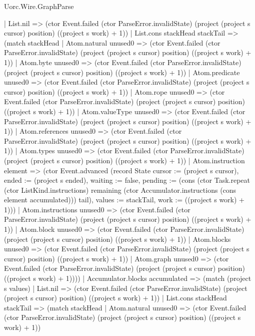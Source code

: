 \begin{lexlean}{Uorc.Wire.GraphParse}
\begin{semanticmodule}
{          | List.nil => (ctor Event.failed (ctor ParseError.invalidState) (project (project s cursor) position) ((project s work) + 1))
          | List.cons stackHead stackTail => (match stackHead
            | Atom.natural unused0 => (ctor Event.failed (ctor ParseError.invalidState) (project (project s cursor) position) ((project s work) + 1))
            | Atom.byte unused0 => (ctor Event.failed (ctor ParseError.invalidState) (project (project s cursor) position) ((project s work) + 1))
            | Atom.predicate unused0 => (ctor Event.failed (ctor ParseError.invalidState) (project (project s cursor) position) ((project s work) + 1))
            | Atom.rope unused0 => (ctor Event.failed (ctor ParseError.invalidState) (project (project s cursor) position) ((project s work) + 1))
            | Atom.valueType unused0 => (ctor Event.failed (ctor ParseError.invalidState) (project (project s cursor) position) ((project s work) + 1))
            | Atom.references unused0 => (ctor Event.failed (ctor ParseError.invalidState) (project (project s cursor) position) ((project s work) + 1))
            | Atom.types unused0 => (ctor Event.failed (ctor ParseError.invalidState) (project (project s cursor) position) ((project s work) + 1))
            | Atom.instruction element => (ctor Event.advanced (record State {cursor := (project s cursor), ended := (project s ended), waiting := false, pending := (cons (ctor Task.repeat (ctor ListKind.instructions) remaining (ctor Accumulator.instructions (cons element accumulated))) tail), values := stackTail, work := ((project s work) + 1)}))
            | Atom.instructions unused0 => (ctor Event.failed (ctor ParseError.invalidState) (project (project s cursor) position) ((project s work) + 1))
            | Atom.block unused0 => (ctor Event.failed (ctor ParseError.invalidState) (project (project s cursor) position) ((project s work) + 1))
            | Atom.blocks unused0 => (ctor Event.failed (ctor ParseError.invalidState) (project (project s cursor) position) ((project s work) + 1))
            | Atom.graph unused0 => (ctor Event.failed (ctor ParseError.invalidState) (project (project s cursor) position) ((project s work) + 1))))
        | Accumulator.blocks accumulated => (match (project s values)
          | List.nil => (ctor Event.failed (ctor ParseError.invalidState) (project (project s cursor) position) ((project s work) + 1))
          | List.cons stackHead stackTail => (match stackHead
            | Atom.natural unused0 => (ctor Event.failed (ctor ParseError.invalidState) (project (project s cursor) position) ((project s work) + 1))
}
\end{semanticmodule}
\end{lexlean}
